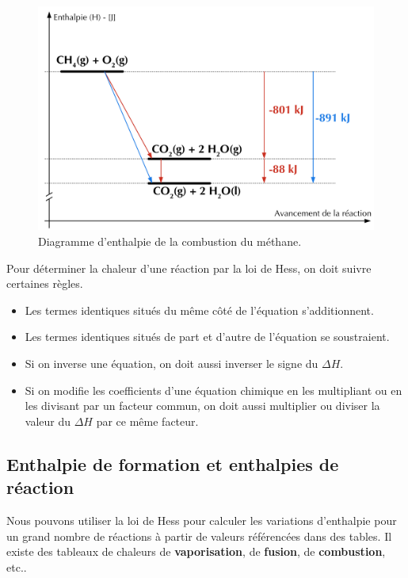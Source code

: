 \documentclass[
  11pt,
  a4paper,
  openany]{book}
\providecommand{\tightlist}{%
  \setlength{\itemsep}{0pt}\setlength{\parskip}{0pt}}
\begin{document}
\begin{figure}

{\centering \includegraphics[width=0.67\linewidth]{images/Enthalpie-2} 

}

\caption{Diagramme d'enthalpie de la combustion du méthane.}\label{fig:enthalpie-2}
\end{figure}
\clearpage

Pour déterminer la chaleur d'une réaction par la loi de Hess, on doit suivre certaines règles.

\begin{itemize}
\tightlist
\item
  Les termes identiques situés du même côté de l'équation s'additionnent.
\item
  Les termes identiques situés de part et d'autre de l'équation se soustraient.
\item
  Si on inverse une équation, on doit aussi inverser le signe du \(\Delta H\).
\item
  Si on modifie les coefficients d'une équation chimique en les multipliant ou en les divisant par un facteur commun, on doit aussi multiplier ou diviser la valeur du \(\Delta H\) par ce même facteur.
\end{itemize}

\hypertarget{enthalpie-de-formation-et-enthalpies-de-ruxe9action}{%
\subsection{Enthalpie de formation et enthalpies de réaction}\label{enthalpie-de-formation-et-enthalpies-de-ruxe9action}}

Nous pouvons utiliser la loi de Hess pour calculer les variations d'enthalpie pour un grand nombre de réactions à partir de valeurs référencées dans des tables. Il existe des tableaux de chaleurs de \textbf{vaporisation}, de \textbf{fusion}, de \textbf{combustion}, etc..
\end{document}
